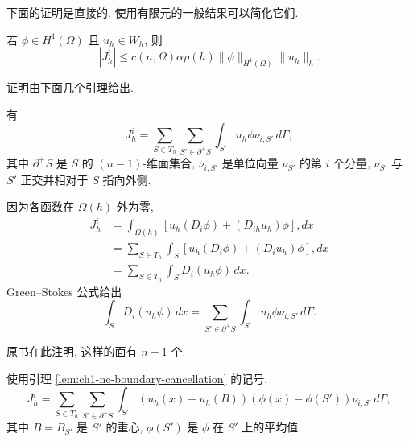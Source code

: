 下面的证明是直接的. 使用有限元的一般结果可以简化它们.

\begin{Proposition}
\label{prop:ch1-nc-jh-h1-estimate}
若 $\phi\in H^1(\Omega)$ 且 $u_h\in W_h$, 则
\begin{equation}
|J_h^i|\leq c(n,\Omega)\alpha\rho(h)
\|\phi\|_{H^1(\Omega)}\|u_h\|_h.
\label{eq:ch1-nc-jh-h1-estimate}
\end{equation}
\end{Proposition}

证明由下面几个引理给出.

\begin{Lemma}
\label{lem:ch1-nc-boundary-cancellation}
有
\begin{equation}
J_h^i=\sum_{S\in T_h}\sum_{S'\in\partial^+S}
\int_{S'}u_h\phi\nu_{i,S'}\,d\Gamma,
\label{eq:ch1-nc-jh-face-sum}
\end{equation}
其中 $\partial^+S$ 是 $S$ 的 $(n-1)$-维面集合, $\nu_{i,S'}$ 是单位向量 $\nu_{S'}$ 的第 $i$ 个分量, $\nu_{S'}$ 与 $S'$ 正交并相对于 $S$ 指向外侧.
\end{Lemma}

\begin{Proof}
因为各函数在 $\Omega(h)$ 外为零,
\[
\begin{aligned}
J_h^i
&=\int_{\Omega(h)}[u_h(D_i\phi)+(D_{ih}u_h)\phi],dx\\
&=\sum_{S\in T_h}\int_S[u_h(D_i\phi)+(D_iu_h)\phi],dx\\
&=\sum_{S\in T_h}\int_SD_i(u_h\phi)\,dx.
\end{aligned}
\]
Green--Stokes 公式给出
\[
\int_SD_i(u_h\phi)\,dx
=\sum_{S'\in\partial^+S}\int_{S'}u_h\phi\nu_{i,S'}\,d\Gamma.
\]
\end{Proof}

原书在此注明, 这样的面有 $n-1$ 个.

\begin{Lemma}
\label{lem:ch1-nc-boundary-difference}
使用引理 \ref{lem:ch1-nc-boundary-cancellation} 的记号,
\begin{equation}
J_h^i=\sum_{S\in T_h}\sum_{S'\in\partial^+S}
\int_{S'}(u_h(x)-u_h(B))(\phi(x)-\phi(S'))
\nu_{i,S'}\,d\Gamma,
\label{eq:ch1-nc-jh-difference-form}
\end{equation}
其中 $B=B_{S'}$ 是 $S'$ 的重心, $\phi(S')$ 是 $\phi$ 在 $S'$ 上的平均值.
\end{Lemma}

